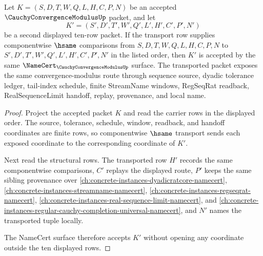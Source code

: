 \begin{theorem}
\label{thm:cauchy-convergence-modulus-carrier-transport}
Let $K=(S,D,T,W,Q,L,H,C,P,N)$ be an accepted $\CauchyConvergenceModulusUp$ packet, and let
$$
K'=(S',D',T',W',Q',L',H',C',P',N')
$$
be a second displayed ten-row packet. If the transport row supplies componentwise $\hsame$ comparisons from $S,D,T,W,Q,L,H,C,P,N$ to $S',D',T',W',Q',L',H',C',P',N'$ in the listed order, then $K'$ is accepted by the same $\NameCert_{\CauchyConvergenceModulusUp}$ surface. The transported packet exposes the same convergence-modulus route through sequence source, dyadic tolerance ledger, tail-index schedule, finite StreamName windows, RegSeqRat readback, RealSequenceLimit handoff, replay, provenance, and local name.
\end{theorem}
\begin{proof}
Project the accepted packet $K$ and read the carrier rows in the displayed order. The source, tolerance, schedule, window, readback, and handoff coordinates are finite rows, so componentwise $\hsame$ transport sends each exposed coordinate to the corresponding coordinate of $K'$.

Next read the structural rows. The transported row $H'$ records the same componentwise comparisons, $C'$ replays the displayed route, $P'$ keeps the same sibling provenance over \autoref{ch:concrete-instances-dyadicratcore-namecert}, \autoref{ch:concrete-instances-streamname-namecert}, \autoref{ch:concrete-instances-regseqrat-namecert}, \autoref{ch:concrete-instances-real-sequence-limit-namecert}, and \autoref{ch:concrete-instances-regular-cauchy-completion-universal-namecert}, and $N'$ names the transported tuple locally.

The NameCert surface therefore accepts $K'$ without opening any coordinate outside the ten displayed rows.
\end{proof}

